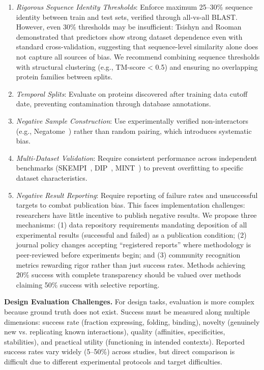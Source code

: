 \begin{enumerate}
    \item \textit{Rigorous Sequence Identity Thresholds}: Enforce maximum 25--30\% sequence identity between train and test sets, verified through all-vs-all BLAST. However, even 30\% thresholds may be insufficient: Tsishyn and Rooman~\cite{bernett2024bias} demonstrated that predictors show strong dataset dependence even with standard cross-validation, suggesting that sequence-level similarity alone does not capture all sources of bias. We recommend combining sequence thresholds with structural clustering (e.g., TM-score < 0.5) and ensuring no overlapping protein families between splits.
    
    \item \textit{Temporal Splits}: Evaluate on proteins discovered after training data cutoff date, preventing contamination through database annotations.
    
    \item \textit{Negative Sample Construction}: Use experimentally verified non-interactors (e.g., Negatome~\cite{blohm2014negatome2}) rather than random pairing, which introduces systematic bias.
    
    \item \textit{Multi-Dataset Validation}: Require consistent performance across independent benchmarks (SKEMPI~\cite{jankauskaite2019skempi2}, DIP~\cite{salwinski2004dip}, MINT~\cite{chatr2015mint}) to prevent overfitting to specific dataset characteristics.
    
    \item \textit{Negative Result Reporting}: Require reporting of failure rates and unsuccessful targets to combat publication bias. This faces implementation challenges: researchers have little incentive to publish negative results. We propose three mechanisms: (1) data repository requirements mandating deposition of all experimental results (successful and failed) as a publication condition; (2) journal policy changes accepting ``registered reports'' where methodology is peer-reviewed before experiments begin; and (3) community recognition metrics rewarding rigor rather than just success rates. Methods achieving 20\% success with complete transparency should be valued over methods claiming 50\% success with selective reporting.
\end{enumerate}

\textbf{Design Evaluation Challenges.} For design tasks, evaluation is more complex because ground truth does not exist. Success must be measured along multiple dimensions: success rate (fraction expressing, folding, binding), novelty (genuinely new vs. replicating known interactions), quality (affinities, specificities, stabilities), and practical utility (functioning in intended contexts). Reported success rates vary widely (5--50\%) across studies, but direct comparison is difficult due to different experimental protocols and target difficulties.

